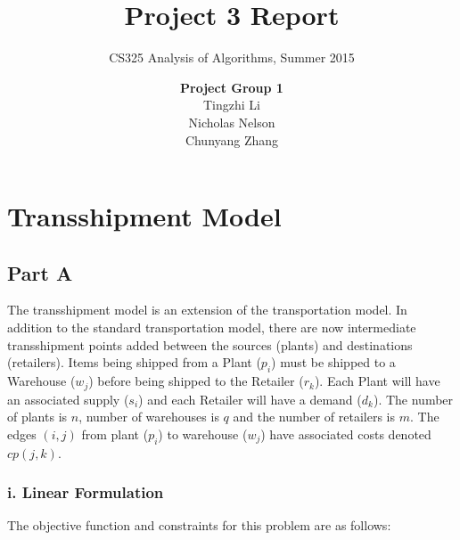 \documentclass[11pt]{scrreprt}
\title{\textbf{Project 3 Report}}
\subtitle{CS325 Analysis of Algorithms, Summer 2015}
\author{\textsf{\textbf{Project Group 1}}\\
		\textsf{Tingzhi Li}\\
		\textsf{Nicholas Nelson}\\
		\textsf{Chunyang Zhang}}
\date{}
\begin{document}
\maketitle

\chapter{Transshipment Model}
\section{Part A}
The transshipment model is an extension of the transportation model. 
In addition to the standard transportation model, there are now 
intermediate transshipment points added between the sources (plants) 
and destinations (retailers). Items being shipped from a Plant 
($p_i$) must be shipped to a Warehouse ($w_j$) before being shipped 
to the Retailer ($r_k$). Each Plant will have an associated supply 
($s_i$) and each Retailer will have a demand ($d_k$). The number of 
plants is $n$, number of warehouses is $q$ and the number of 
retailers is $m$. The edges $(i,j)$ from plant ($p_i$) to warehouse 
($w_j$) have associated costs denoted $cp(j,k)$.

\subsection{i. Linear Formulation}

The objective function and constraints for this problem are as 
follows:
\end{document}
